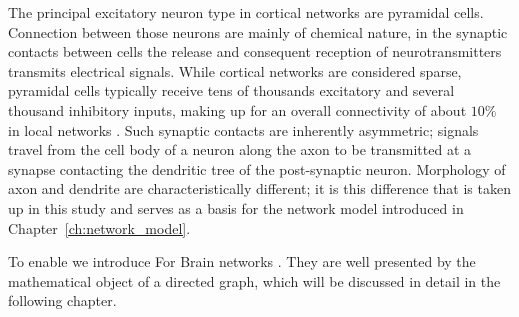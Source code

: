 The principal excitatory neuron type in cortical
networks are pyramidal cells. Connection between those neurons are mainly of chemical
nature, in the synaptic contacts between cells the release and
consequent reception of neurotransmitters transmits electrical
signals. While cortical networks are considered sparse, pyramidal
cells typically receive tens of thousands excitatory and several
thousand inhibitory inputs, making up for an overall connectivity of
about $10\%$ in local networks \parencite{Spruston2009}. Such synaptic
contacts are inherently asymmetric; signals travel from the cell body
of a neuron along the axon to be transmitted at a synapse contacting
the dendritic tree of the post-synaptic neuron. Morphology of axon and
dendrite are characteristically different; it is this difference that
is taken up in this study and serves as a basis for the network model introduced in Chapter~\ref{ch:network_model}.

To enable we introduce 
For Brain networks . They are well presented by the mathematical
object of a directed graph, which will be discussed in detail in the
following chapter.









